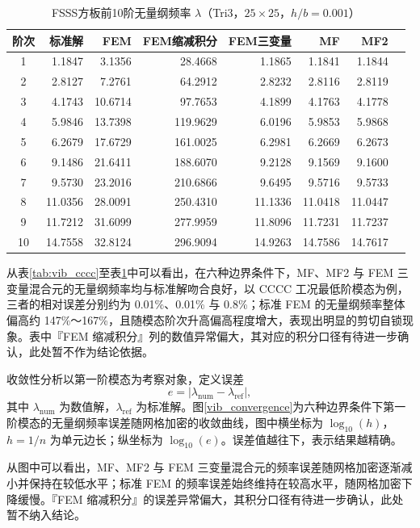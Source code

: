 \begin{table}[H]
\centering
\caption{FSSS方板前10阶无量纲频率 $\lambda$（Tri3，$25\times25$，$h/b=0.001$）}
\label{tab:vib_fsss}
\begin{tabular}{crrrrrrr}
\hline
阶次 & 标准解\cite{liew1993} & FEM & FEM缩减积分 & FEM三变量 & MF & MF2 \\
\hline
1 & 1.1847 & 3.1356 & 28.4668 & 1.1865 & 1.1841 & 1.1844 \\
2 & 2.8127 & 7.2761 & 64.2912 & 2.8232 & 2.8116 & 2.8119 \\
3 & 4.1743 & 10.6714 & 97.7653 & 4.1899 & 4.1763 & 4.1778 \\
4 & 5.9846 & 13.7398 & 119.9629 & 6.0196 & 5.9853 & 5.9868 \\
5 & 6.2679 & 17.6729 & 161.0025 & 6.2981 & 6.2669 & 6.2673 \\
6 & 9.1486 & 21.6411 & 188.6070 & 9.2128 & 9.1569 & 9.1600 \\
7 & 9.5730 & 23.2016 & 210.6866 & 9.6495 & 9.5716 & 9.5733 \\
8 & 11.0356 & 28.0091 & 250.4310 & 11.1336 & 11.0418 & 11.0447 \\
9 & 11.7212 & 31.6099 & 277.9959 & 11.8096 & 11.7231 & 11.7237 \\
10 & 14.7558 & 32.8124 & 296.9094 & 14.9263 & 14.7586 & 14.7617 \\
\hline
\end{tabular}
\end{table}

从表\ref{tab:vib_cccc}至表\ref{tab:vib_fsss}中可以看出，在六种边界条件下，MF、MF2 与 FEM 三变量混合元的无量纲频率均与标准解吻合良好，以 CCCC 工况最低阶模态为例，三者的相对误差分别约为 0.01\%、0.01\% 与 0.8\%；标准 FEM 的无量纲频率整体偏高约 147\%～167\%，且随模态阶次升高偏高程度增大，表现出明显的剪切自锁现象。表中『FEM 缩减积分』列的数值异常偏大，其对应的积分口径有待进一步确认，此处暂不作为结论依据。

收敛性分析以第一阶模态为考察对象，定义误差
\begin{equation}
e = |\lambda_{\mathrm{num}} - \lambda_{\mathrm{ref}}|,
\end{equation}
其中 $\lambda_{\mathrm{num}}$ 为数值解，$\lambda_{\mathrm{ref}}$ 为标准解。图\ref{vib_convergence}为六种边界条件下第一阶模态的无量纲频率误差随网格加密的收敛曲线，图中横坐标为 $\log_{10}(h)$，$h=1/n$ 为单元边长；纵坐标为 $\log_{10}(e)$。误差值越往下，表示结果越精确。

从图中可以看出，MF、MF2 与 FEM 三变量混合元的频率误差随网格加密逐渐减小并保持在较低水平；标准 FEM 的频率误差始终维持在较高水平，随网格加密下降缓慢。『FEM 缩减积分』的误差异常偏大，其积分口径有待进一步确认，此处暂不纳入结论。

